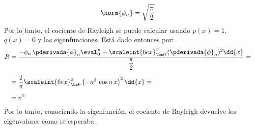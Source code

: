 \begin{ejemplo}
\begin{align*}
\norm{\phi_{n}} = \sqrt{\dfrac{\pi}{2}}
\end{align*}
Por lo tanto, el cociente de Rayleigh se puede calcular usando $p(x) = 1$, $q (x) = 0$ y las eigenfunciones. Está dado entonces por:
\begin{align}
\begin{aligned}[b]
R &= \dfrac{- \phi_{n} \, \pderivada{\phi}_{n} \eval_{0}^{\pi} + \scaleint{6ex}_{\bs 0}^{\pi} \, (\pderivada{\phi}_{n})^{2} \dd{x}}{\dfrac{\pi}{2}} = \\[0.5em]
&= \dfrac{2}{\pi} \scaleint{6ex}_{\bs 0}^{\pi} \left( - n^{2} \, \cos n \, x \right)^{2} \dd{x} = \\[0.5em]
&= n^{2}
\end{aligned}
\label{eq:ecuacion_04_13}
\end{align}
Por lo tanto, conociendo la eigenfunción, el cociente de Rayleigh devuelve los eigenvalores como se esperaba.
\end{ejemplo}

